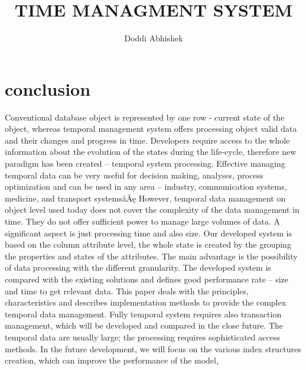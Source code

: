 \documentclass{article}
\title{TIME MANAGMENT SYSTEM}
\author{Doddi Abhishek}
\begin{document}
\maketitle






\section{conclusion}
Conventional database object is represented by one row - current state of the object, whereas temporal management
system offers processing object valid data and their changes and progress in time. Developers require access to the
whole information about the evolution of the states during the life-cycle, therefore new paradigm has been created –
temporal system processing. Effective managing temporal data can be very useful for decision making, analyses, process
optimization and can be used in any area – industry, communication systems, medicine, and transport systemsâĂę
However, temporal data management on object level used today does not cover the complexity of the data management
in time. They do not offer sufficient power to manage large volumes of data. A significant aspect is just processing time
and also size.
Our developed system is based on the column attribute level, the whole state is created by the grouping the properties
and states of the attributes. The main advantage is the possibility of data processing with the different granularity.
The developed system is compared with the existing solutions and defines good performance rate – size and time to get
relevant data.
This paper deals with the principles, characteristics and describes implementation methods to provide the complex
temporal data management.
Fully temporal system requires also transaction management, which will be developed and compared in the close future.
The temporal data are usually large; the processing requires sophisticated access methods. In the future development,
we will focus on the various index structures creation, which can improve the performance of the model,
\end{document}
